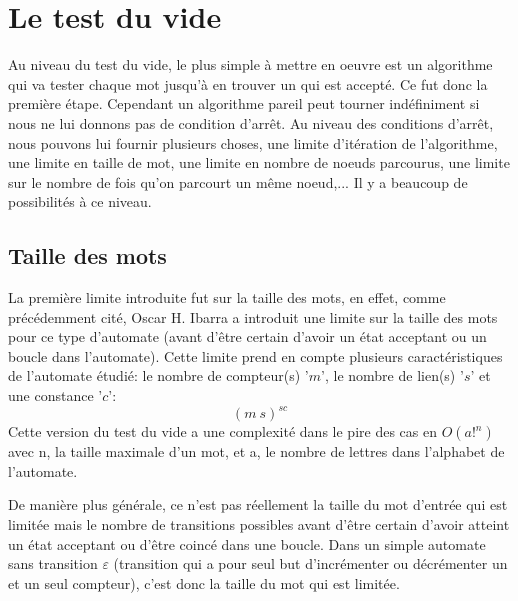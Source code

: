 \section{Le test du vide}
Au niveau du test du vide, le plus simple à mettre en oeuvre est un algorithme qui va tester chaque mot jusqu'à en trouver un qui est accepté. Ce fut donc la première étape. Cependant un algorithme pareil peut tourner indéfiniment si nous ne lui donnons pas de condition d'arrêt. Au niveau des conditions d'arrêt, nous pouvons lui fournir plusieurs choses, une limite d'itération de l'algorithme, une limite en taille de mot, une limite en nombre de noeuds parcourus, une limite sur le nombre de fois qu'on parcourt un même noeud,... Il y a beaucoup de possibilités à ce niveau.\par


\subsection{Taille des mots}
La première limite introduite fut sur la taille des mots, en effet, comme précédemment cité, Oscar H. Ibarra a introduit une limite sur la taille des mots pour ce type d'automate (avant d'être certain d'avoir un état acceptant ou un boucle dans l'automate). Cette limite prend en compte plusieurs caractéristiques de l'automate étudié: le nombre de compteur(s) '$m$', le nombre de lien(s) '$s$' et une constance '$c$':
\[ ( m \  s ) ^{s  c} \]
Cette version du test du vide a une complexité dans le pire des cas en $O(a!^{n})$ avec n, la taille maximale d'un mot, et a, le nombre de lettres dans l'alphabet de l'automate.\par
De manière plus générale, ce n'est pas réellement la taille du mot d'entrée qui est limitée mais le nombre de transitions possibles avant d'être certain d'avoir atteint un état acceptant ou d'être coincé dans une boucle. Dans un simple automate sans transition $\varepsilon$ (transition qui a pour seul but d'incrémenter ou décrémenter un et un seul compteur), c'est donc la taille du mot qui est limitée.\par

